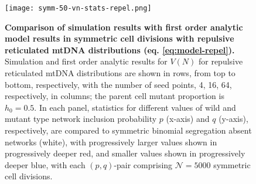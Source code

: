 \documentclass{article}
\begin{document}
\begin{appendices}
\begin{figure}[!ht]
        \centering \texttt{[image: symm-50-vn-stats-repel.png]}
        \caption{ \textbf{Comparison of simulation results with first order analytic model results in symmetric cell divisions with repulsive reticulated mtDNA distributions (eq. \ref{eq:model-repel}).} Simulation and first order analytic results for $V(N)$ for repulsive reticulated mtDNA distributions are shown in rows, from top to bottom, respectively, with the number of seed points, 4, 16, 64, respectively, in columns; the parent cell mutant proportion is $h_0=0.5$. In each panel, statistics for different values of wild and mutant type network inclusion probability $p$ (x-axis) and $q$ (y-axis), respectively, are compared to symmetric binomial segregation absent networks (white), with progressively larger values shown in progressively deeper red, and smaller values shown in progressively deeper blue, with each $(p,q)$-pair comprising $\mathcal{N}=5000$ symmetric cell divisions.}\label{fig:app-vn-stats-repel}
\end{figure}

\end{appendices}
\end{document}
